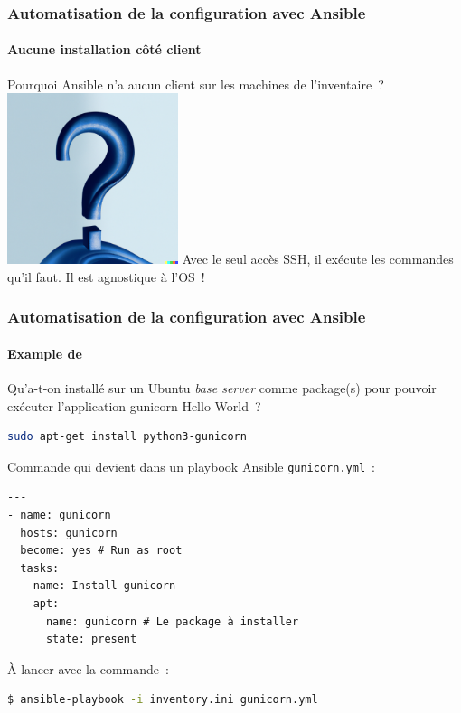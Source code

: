 \documentclass{beamer}
\begin{document}
    \begin{frame}
        \transdissolve
        \frametitle{Automatisation de la configuration avec Ansible}
        \framesubtitle{Aucune installation côté client}
        Pourquoi Ansible n'a aucun client sur les machines de l'inventaire~?
        \bigbreak
        \centering
        \includegraphics[width=5cm]{image/question-mark-on-a-blank-background}
        \bigbreak
        \pause
        \flushleft
        Avec le seul accès SSH, il exécute les commandes qu'il faut.
        Il est agnostique à l'OS~!
    \end{frame}

    \begin{frame}[fragile]
        \transdissolve
        \frametitle{Automatisation de la configuration avec Ansible}
        \framesubtitle{Example de }
        Qu'a-t-on installé sur un Ubuntu \textit{base server} comme package(s) pour pouvoir exécuter l'application gunicorn Hello World~?
        \pause
        \begin{lstlisting}[language=bash]
sudo apt-get install python3-gunicorn
        \end{lstlisting}
        Commande qui devient dans un playbook Ansible \lstinline{gunicorn.yml}~:
        \begin{lstlisting}
---
- name: gunicorn
  hosts: gunicorn
  become: yes # Run as root
  tasks:
  - name: Install gunicorn
    apt:
      name: gunicorn # Le package à installer
      state: present
        \end{lstlisting}
        À lancer avec la commande~:
        \begin{lstlisting}[language=bash]
$ ansible-playbook -i inventory.ini gunicorn.yml
        \end{lstlisting}
    \end{frame}
\end{document}
